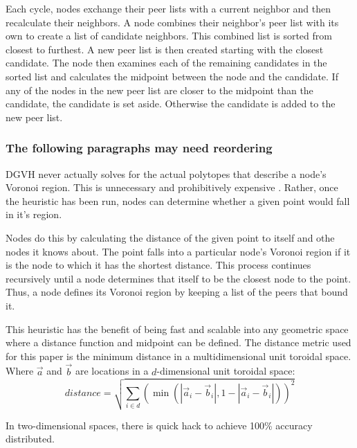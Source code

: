 \documentclass[11pt, conference, letterpaper]{IEEEtran}
\begin{document}
Each cycle, nodes exchange their peer lists with a current neighbor and then recalculate their neighbors.  
A node combines their neighbor's peer list with its own to create a list of candidate neighbors.
This combined list is sorted from closest to furthest.
A new peer list is then created starting with the closest candidate.
The node then examines each of the remaining candidates in the sorted list and calculates the midpoint between the node and the candidate.
If any of the nodes in the new peer list are closer to the midpoint than the candidate, the candidate is set aside.  
Otherwise the candidate is added to the new peer list.







\subsubsection*{The following paragraphs may need reordering}


DGVH never actually solves for the actual polytopes that describe a node's Voronoi region.
This is unnecessary and prohibitively expensive \cite{raynet}.
Rather, once the heuristic has been run, nodes can determine whether a given point would fall in it's region.

Nodes do this by calculating the distance of the given point to itself and othe nodes it knows about.
The point falls into a particular node's Voronoi region if it is the node to which it has the shortest distance.
This process continues recursively until a node determines that itself to be the closest node to the point.
Thus, a node defines its Voronoi region by keeping a list of the peers that bound it.



This heuristic has the benefit of being fast and scalable into any geometric space where a distance function and midpoint can be defined.
The distance metric used for this paper is the minimum distance in a multidimensional unit toroidal space.
Where $\vec{a}$ and $\vec{b}$ are locations in a $d$-dimensional unit toroidal space:
\[ distance = \sqrt{\sum\limits_{i\in d} (\min(|\vec{a}_i-\vec{b}_i|, 1-|\vec{a}_i-\vec{b}_i|))^2}\]


In two-dimensional spaces, there is quick hack to achieve 100\% accuracy distributed.
\end{document}
